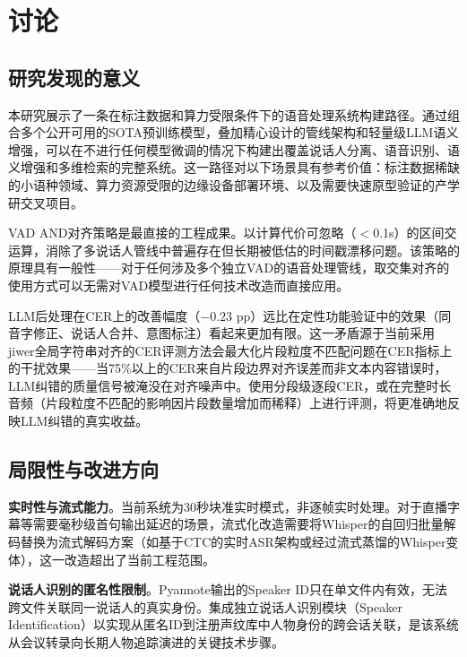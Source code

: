 \documentclass[12pt, a4paper]{article}
\begin{document}
\section{讨论}

\subsection{研究发现的意义}

本研究展示了一条在标注数据和算力受限条件下的语音处理系统构建路径。通过组合多个公开可用的SOTA预训练模型，叠加精心设计的管线架构和轻量级LLM语义增强，可以在不进行任何模型微调的情况下构建出覆盖说话人分离、语音识别、语义增强和多维检索的完整系统。这一路径对以下场景具有参考价值：标注数据稀缺的小语种领域、算力资源受限的边缘设备部署环境、以及需要快速原型验证的产学研交叉项目。

VAD AND对齐策略是最直接的工程成果。以计算代价可忽略（$<$0.1s）的区间交运算，消除了多说话人管线中普遍存在但长期被低估的时间戳漂移问题。该策略的原理具有一般性——对于任何涉及多个独立VAD的语音处理管线，取交集对齐的使用方式可以无需对VAD模型进行任何技术改造而直接应用。

LLM后处理在CER上的改善幅度（$-0.23$ pp）远比在定性功能验证中的效果（同音字修正、说话人合并、意图标注）看起来更加有限。这一矛盾源于当前采用jiwer全局字符串对齐的CER评测方法会最大化片段粒度不匹配问题在CER指标上的干扰效果——当75\%以上的CER来自片段边界对齐误差而非文本内容错误时，LLM纠错的质量信号被淹没在对齐噪声中。使用分段级逐段CER，或在完整时长音频（片段粒度不匹配的影响因片段数量增加而稀释）上进行评测，将更准确地反映LLM纠错的真实收益。

\subsection{局限性与改进方向}

\textbf{实时性与流式能力}。当前系统为30秒块准实时模式，非逐帧实时处理。对于直播字幕等需要毫秒级首句输出延迟的场景，流式化改造需要将Whisper的自回归批量解码替换为流式解码方案（如基于CTC的实时ASR架构或经过流式蒸馏的Whisper变体），这一改造超出了当前工程范围。

\textbf{说话人识别的匿名性限制}。Pyannote输出的Speaker ID只在单文件内有效，无法跨文件关联同一说话人的真实身份。集成独立说话人识别模块（Speaker Identification）以实现从匿名ID到注册声纹库中人物身份的跨会话关联，是该系统从会议转录向长期人物追踪演进的关键技术步骤。
\end{document}
